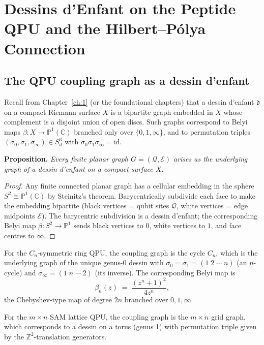 \documentclass[11pt,oneside]{amsbook}
\numberwithin{equation}{section}
\theoremstyle{plain}
\theoremstyle{definition}
\theoremstyle{remark}
\begin{document}
\section{Dessins d'Enfant on the Peptide QPU and the Hilbert--P\'olya Connection}
\label{sec:pqpu_HP_connection}

\subsection{The QPU coupling graph as a dessin d'enfant}
\label{subsec:pqpu_dessin}

Recall from Chapter~\ref{ch:1} (or the foundational chapters) that a
dessin d'enfant $\mathfrak{d}$ on a compact Riemann surface $X$ is a bipartite
graph embedded in $X$ whose complement is a disjoint union of open discs.
Such graphs correspond to Belyi maps $\beta: X \to \mathbb{P}^1(\mathbb{C})$
branched only over $\{0, 1, \infty\}$, and to permutation triples
$(\sigma_0, \sigma_1, \sigma_\infty) \in S_d^3$ with $\sigma_0\sigma_1\sigma_\infty = \text{id}$.

\textbf{Proposition.}  \emph{Every finite planar graph $G = (\mathcal{Q}, \mathcal{E})$
arises as the underlying graph of a dessin d'enfant on a compact surface $X$.}

\begin{proof}
Any finite connected planar graph has a cellular embedding in the sphere
$S^2 \cong \mathbb{P}^1(\mathbb{C})$ by Steinitz's theorem.  Barycentrically
subdivide each face to make the embedding bipartite (black vertices = qubit
sites $\mathcal{Q}$, white vertices = edge midpoints $\mathcal{E}$).  The
barycentric subdivision is a dessin d'enfant; the corresponding Belyi map
$\beta: S^2 \to \mathbb{P}^1$ sends black vertices to $0$, white vertices to
$1$, and face centres to $\infty$.
\end{proof}

For the $C_n$-symmetric ring QPU, the coupling graph is the cycle $C_n$, which
is the underlying graph of the unique genus-$0$ dessin with $\sigma_0 = \sigma_1
= (1\;2\;\cdots\;n)$ (an $n$-cycle) and $\sigma_\infty = (1\;n\;\cdots\;2)$
(its inverse).  The corresponding Belyi map is
\[
  \beta_n(z) \;=\; \frac{(z^n + 1)^2}{4z^n},
\]
the Chebyshev-type map of degree $2n$ branched over $0, 1, \infty$.

For the $m \times n$ SAM lattice QPU, the coupling graph is the $m \times n$ grid
graph, which corresponds to a dessin on a torus (genus 1) with permutation
triple given by the $\mathbb{Z}^2$-translation generators.
\end{document}
